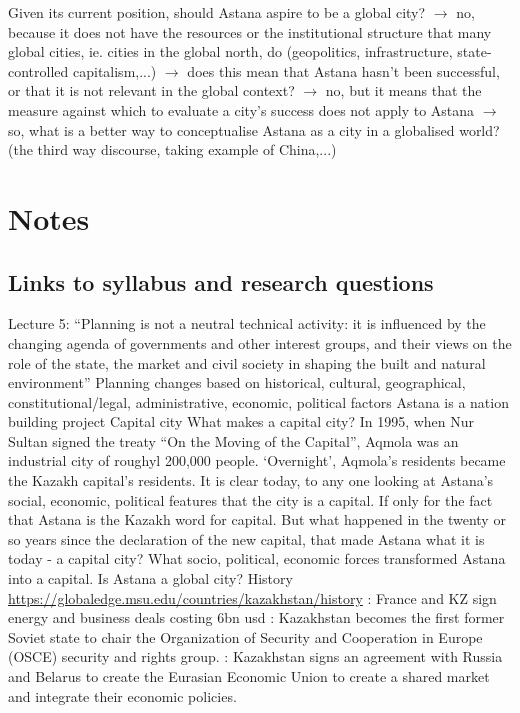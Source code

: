 \documentclass{article}
\begin{document}
Given its current position, should Astana aspire to be a global city? $\rightarrow$ no, because it does not have the resources or the institutional structure that many global cities, ie. cities in the global north, do (geopolitics, infrastructure, state-controlled capitalism,...) $\rightarrow$ does this mean that Astana hasn’t been successful, or that it is not relevant in the global context? $\rightarrow$ no, but it means that the measure against which to evaluate a city’s success does not apply to Astana $\rightarrow$ so, what is a better way to conceptualise Astana as a city in a globalised world? (the third way discourse, taking example of China,...)



\section{Notes}

\subsection{Links to syllabus and research questions}

\begin{outline}
	\1 Lecture 5: ``Planning is not a neutral technical activity: it is influenced by the changing agenda of governments and other interest groups, and their views on the role of the state, the market and civil society in shaping the built and natural environment''
		\2 Planning changes based on historical, cultural, geographical, constitutional/legal, administrative, economic, political factors
	\1 Astana is a nation building project
	\1 Capital city
		\2 What makes a capital city? In 1995, when Nur Sultan signed the treaty ``On the Moving of the Capital'', Aqmola was an industrial city of roughyl 200,000 people. `Overnight', Aqmola's residents became the Kazakh capital's residents. 
		\2 It is clear today, to any one looking at Astana's social, economic, political features that the city is a capital. If only for the fact that Astana is the Kazakh word for capital. But what happened in the twenty or so years since the declaration of the new capital, that made Astana what it is today - a capital city?
		\2 What socio, political, economic forces transformed Astana into a capital. Is Astana a global city?
	\1 History \url{https://globaledge.msu.edu/countries/kazakhstan/history}
		: France and KZ sign energy and business deals costing 6bn usd
		: Kazakhstan becomes the first former Soviet state to chair the Organization of Security and Cooperation in Europe (OSCE) security and rights group.
		: Kazakhstan signs an agreement with Russia and Belarus to create the Eurasian Economic Union to create a shared market and integrate their economic policies. 
\end{outline}
\end{document}
